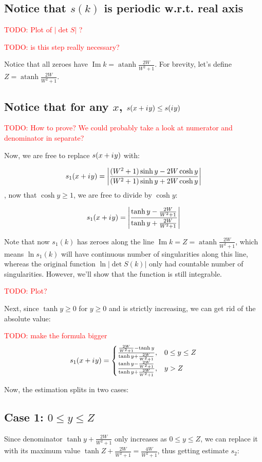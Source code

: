 \documentclass[12pt, a4paper]{article}
\newcommand{\abs}[1]{\left| #1 \right|}
\newcommand{\iu}{{i\mkern1mu}}
\renewcommand{\Im}{\operatorname{Im}}
\newcommand{\todo}[1]{{\large \textcolor{red}{TODO: #1}}}
\DeclareMathOperator\atanh{atanh}
\begin{document}
\subsection{Notice that $s(k)$ is periodic w.r.t. real axis}
\todo{Plot of $\abs{\det S}$ ?}

\todo{is this step really necessary?}

Notice that all zeroes have $\Im k = \atanh \frac{2 W}{W^2 + 1}$. For brevity, let's define $Z = \atanh \frac{2 W}{W^2 + 1}$.

\subsection{Notice that for any $x$, $s(x + \iu y) \le s(\iu y)$}
\todo{How to prove? We could probably take a look at numerator and denominator in separate?}

Now, we are free to replace $s(x + \iu y)$ with:

\[
s_1(x + \iu y)
 = \abs{\frac{(W^2 + 1) \sinh y - 2 W \cosh y}{(W^2 + 1) \sinh y + 2 W \cosh y}}
\]
, now that $\cosh y \ge 1$, we are free to divide by $\cosh y$:

\[
s_1(x + \iu y)
 = \abs{\frac{\tanh y - \frac{2 W}{W^2 + 1}}{\tanh y + \frac{2 W}{W^2 + 1}}}
\]

Note that now $s_1(k)$ has zeroes along the line $\Im k = Z = \atanh \frac{2 W}{W^2 + 1}$, which means $\ln s_1(k)$ will have continuous number of singularities along this line, whereas the original function $\ln\abs{\det S(k)}$ only had countable number of singularities. However, we'll show that the function is still integrable.

\todo{Plot?}

Next, since $\tanh y \ge 0$ for $y \ge 0$ and is strictly increasing, we can get rid of the absolute value:

\todo{make the formula bigger}
\[
s_1(x + \iu y)
 = \begin{cases}
 \frac{\frac{2 W}{W^2 + 1} - \tanh y}{\tanh y + \frac{2 W}{W^2 + 1}}, & 0 \le y \le Z \\
 \frac{\tanh y - \frac{2 W}{W^2 + 1}}{\tanh y + \frac{2 W}{W^2 + 1}}, & y > Z 
 \end{cases}
\]

Now, the estimation splits in two cases:

\subsection*{Case 1: $0 \le y \le Z$}
Since denominator $\tanh y + \frac{2 W}{W^2 + 1}$ only increases as $0 \le y \le Z$, we can replace it with its maximum value $\tanh Z + \frac{2 W}{W^2 + 1} = \frac{4 W}{W^2 + 1}$, thus getting estimate $s_2$:
\end{document}
